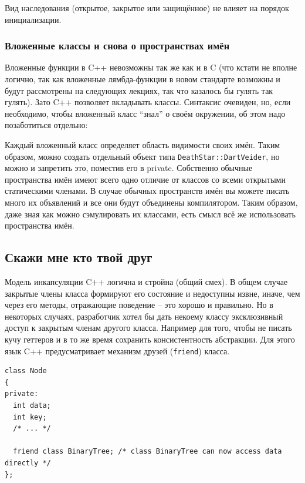 \documentclass[a4paper,12pt,oneside]{article}
\begin{document}
Вид наследования (открытое, закрытое или защищённое) не влияет на порядок инициализации.

\subsubsection{Вложенные классы и снова о пространствах имён}

Вложенные функции в C++ невозможны так же как и в C (что кстати не вполне логично, так как вложенные лямбда-функции в новом стандарте возможны и будут рассмотрены на следующих лекциях, так что казалось бы гулять так гулять). Зато C++ позволяет вкладывать классы. Синтаксис очевиден, но, если необходимо, чтобы вложенный класс ``знал'' о своём окружении, об этом надо позаботиться отдельно:



Каждый вложенный класс определяет область видимости своих имён. Таким образом, можно создать отдельный объект типа \lstinline!DeathStar::DartVeider!, но можно и запретить это, поместив его в private. Собственно обычные пространства имён имеют всего одно отличие от классов со всеми открытыми статическими членами. В случае обычных пространств имён вы можете писать много их объявлений и все они будут объединены компилятором. Таким образом, даже зная как можно сэмулировать их классами, есть смысл всё же использовать пространства имён.

\subsection{Скажи мне кто твой друг}

Модель инкапсуляции C++ логична и стройна (общий смех). В общем случае закрытые члены класса формируют его состояние и недоступны извне, иначе, чем через его методы, отражающие поведение -- это хорошо и правильно. Но в некоторых случаях, разработчик хотел бы дать некоему классу эксклюзивный доступ к закрытым членам другого класса. Например для того, чтобы не писать кучу геттеров и в то же время сохранить консистентность абстракции. Для этого язык C++ предусматривает механизм друзей (\lstinline!friend!) класса.

\begin{lstlisting}
class Node 
{
private: 
  int data;
  int key;
  /* ... */

  friend class BinaryTree; /* class BinaryTree can now access data directly */
};
\end{lstlisting}
\end{document}
